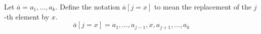 Let $\overline{a} = a_1, \ldots, a_k$.  Define the notation $\overline{a}[j = x]$ to mean the replacement of the $j$-th element by $x$.
$$ \overline{a}[j = x] = a_1, \ldots, a_{j-1}, x, a_{j+1}, \ldots, a_{k}$$

